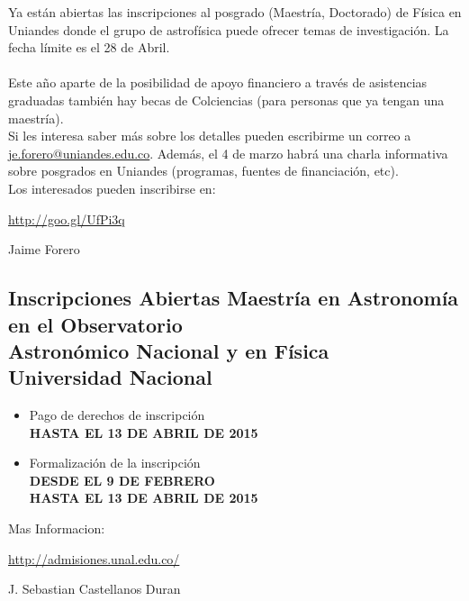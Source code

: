 \documentclass{book}
\begin{document}
Ya están abiertas las inscripciones al posgrado (Maestría, Doctorado) de Física en Uniandes donde el grupo de astrofísica puede ofrecer temas de investigación. La fecha límite es el 28 de Abril.\\
\\
Este año aparte de la posibilidad de apoyo financiero a través de asistencias graduadas también hay becas de Colciencias (para personas que ya tengan una maestría).\\

Si les interesa saber más sobre los detalles pueden escribirme un correo a \url{je.forero@uniandes.edu.co}. Además, el 4 de marzo habrá una charla informativa sobre posgrados en Uniandes (programas, fuentes de financiación, etc).\\

Los interesados pueden inscribirse en:\\

\begin{center}
\url{http://goo.gl/UfPi3q}
\end{center}

\begin{flushright}
Jaime Forero
\end{flushright}


\subsection{Inscripciones Abiertas Maestría en Astronomía en el Observatorio\\ Astronómico Nacional y en Física\\ Universidad Nacional}

\begin{itemize}
\item Pago de derechos de inscripción \\
\textbf{HASTA EL 13 DE ABRIL DE 2015}
\item Formalización de la inscripción\\
\textbf{DESDE EL 9 DE FEBRERO}\\
\textbf{HASTA EL 13 DE ABRIL DE 2015}
\end{itemize}

Mas Informacion:
\begin{center}
\url{http://admisiones.unal.edu.co/}
\end{center}


\begin{flushright}
J. Sebastian Castellanos Duran
\end{flushright}
\end{document}
